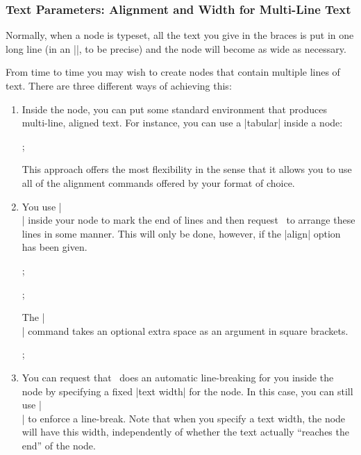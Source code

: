 \subsubsection{Text Parameters: Alignment and Width for Multi-Line Text}

Normally, when a node is typeset, all the text you give in the braces
is put in one long line (in an |\hbox|, to be precise) and the node
will become as wide as necessary.

From time to time you may wish to create nodes that contain multiple
lines of text. There are three different ways of achieving this:
\begin{enumerate}
\item Inside the node, you can put some standard environment that
  produces multi-line, aligned text. For instance, you can use a
  |{tabular}| inside a node:
\begin{codeexample}[width=5cm]
\tikz {};
\end{codeexample}
  This approach offers the most flexibility in the sense that it
  allows you to use all of the alignment commands offered by your
  format of choice.
\item You use |\\| inside your node to mark the end of lines and then
  request \tikzname\ to arrange these lines in some manner. This will
  only be done, however, if the |align| option has been given.
\begin{codeexample}[]
\tikz[align=left] ;
\end{codeexample}
\begin{codeexample}[]
\tikz[align=center] ;
\end{codeexample}
  The |\\| command takes an optional extra space as an argument in square
  brackets.
\begin{codeexample}[]
\tikz {};
\end{codeexample}
\item You can request that \tikzname\ does an automatic line-breaking
  for you inside the node by specifying a fixed |text width| for the
  node. In this case, you can still use |\\| to enforce a
  line-break. Note that when you specify a text width, the node will
  have this width, independently of whether the text actually
  ``reaches the end'' of the node.
\end{enumerate}

